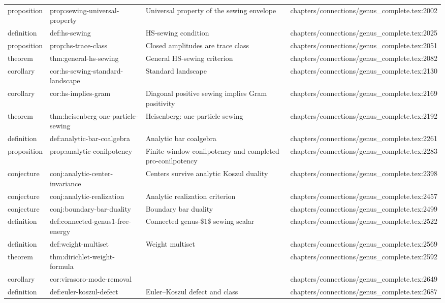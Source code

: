 \documentclass[11pt]{article}
\begin{document}
\begin{longtable}{L{0.10\textwidth}L{0.26\textwidth}L{0.42\textwidth}L{0.22\textwidth}}
proposition & prop:sewing-universal-property & Universal property of the sewing envelope & chapters/connections/genus\_complete.tex:2002\\
definition & def:hs-sewing & HS-sewing condition & chapters/connections/genus\_complete.tex:2025\\
proposition & prop:hs-trace-class & Closed amplitudes are trace class & chapters/connections/genus\_complete.tex:2051\\
theorem & thm:general-hs-sewing & General HS-sewing criterion & chapters/connections/genus\_complete.tex:2082\\
corollary & cor:hs-sewing-standard-landscape & Standard landscape & chapters/connections/genus\_complete.tex:2130\\
corollary & cor:hs-implies-gram & Diagonal positive sewing implies Gram positivity & chapters/connections/genus\_complete.tex:2169\\
theorem & thm:heisenberg-one-particle-sewing & Heisenberg: one-particle sewing & chapters/connections/genus\_complete.tex:2192\\
definition & def:analytic-bar-coalgebra & Analytic bar coalgebra & chapters/connections/genus\_complete.tex:2261\\
proposition & prop:analytic-conilpotency & Finite-window conilpotency and completed pro-conilpotency & chapters/connections/genus\_complete.tex:2283\\
conjecture & conj:analytic-center-invariance & Centers survive analytic Koszul duality & chapters/connections/genus\_complete.tex:2398\\
conjecture & conj:analytic-realization & Analytic realization criterion & chapters/connections/genus\_complete.tex:2457\\
conjecture & conj:boundary-bar-duality & Boundary bar duality & chapters/connections/genus\_complete.tex:2499\\
definition & def:connected-genus1-free-energy & Connected genus-\$1\$ sewing scalar & chapters/connections/genus\_complete.tex:2522\\
definition & def:weight-multiset & Weight multiset & chapters/connections/genus\_complete.tex:2569\\
theorem & thm:dirichlet-weight-formula &  & chapters/connections/genus\_complete.tex:2592\\
corollary & cor:virasoro-mode-removal &  & chapters/connections/genus\_complete.tex:2649\\
definition & def:euler-koszul-defect & Euler--Koszul defect and class & chapters/connections/genus\_complete.tex:2687\\

\end{longtable}
\end{document}
